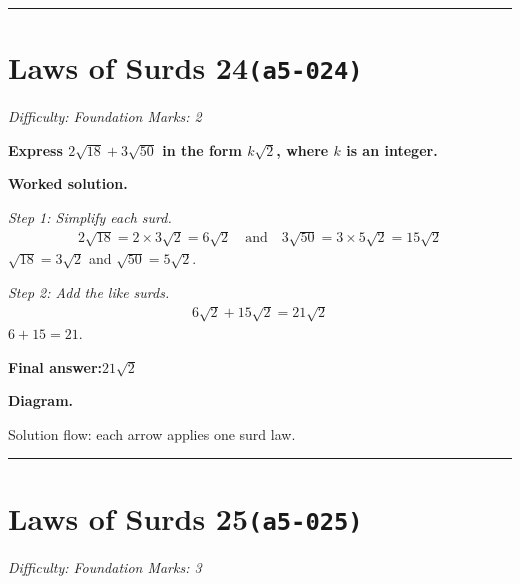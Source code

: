 \documentclass[11pt]{article}
\newcommand{\question}[1]{\par\medskip\noindent\textbf{#1}\par}
\begin{document}
\medskip\hrule

\section*{Laws of Surds 24\quad\small\texttt{(a5-024)}}
\textit{Difficulty: Foundation \quad\textbar\quad Marks: 2}

\question{Express \( 2\sqrt{18} + 3\sqrt{50} \) in the form \( k\sqrt{2} \), where \( k \) is an integer.}

\textbf{Worked solution.}

\textit{Step 1: Simplify each surd.}
\[\begin{gathered}
2\sqrt{18} = 2 \times 3\sqrt{2} = 6\sqrt{2} \quad \text{and} \quad 3\sqrt{50} = 3 \times 5\sqrt{2} = 15\sqrt{2}
\end{gathered}\]
\( \sqrt{18} = 3\sqrt{2} \) and \( \sqrt{50} = 5\sqrt{2} \).

\textit{Step 2: Add the like surds.}
\[\begin{gathered}
6\sqrt{2} + 15\sqrt{2} = 21\sqrt{2}
\end{gathered}\]
\( 6 + 15 = 21 \).

\begin{answerbox}
\textbf{Final answer:}\quad \(\displaystyle 21\sqrt{2}\)
\end{answerbox}
\textbf{Diagram.}

\begin{center}
\end{center}
\small Solution flow: each arrow applies one surd law.\normalsize

\medskip\hrule

\section*{Laws of Surds 25\quad\small\texttt{(a5-025)}}
\textit{Difficulty: Foundation \quad\textbar\quad Marks: 3}
\end{document}
